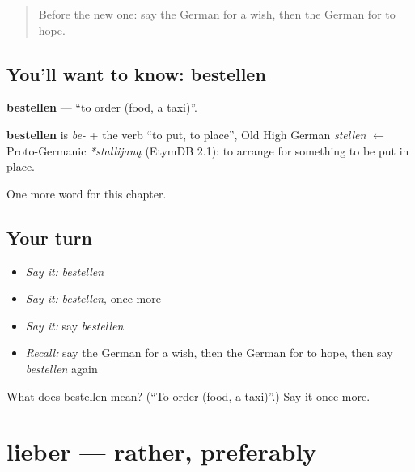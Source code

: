 \label{lesson:GE-C136-bestellen}



\begin{quote}
Before the new one: say the German for a wish, then the German for to hope.
\end{quote}

\subsection*{You'll want to know: bestellen}
\textbf{bestellen} — \textquotedblleft{}to order (food, a taxi)\textquotedblright{}.

\begin{cousinweb}
\textbf{bestellen} is \emph{be-} + the verb \textquotedblleft{}to put, to place\textquotedblright{}, Old High German \emph{stellen} $\leftarrow$ Proto-Germanic \emph{*stallijaną} (EtymDB 2.1): to arrange for something to be put in place.
\end{cousinweb}

\begin{grammarlens}[title={What you've built}]
One more word for this chapter.
\end{grammarlens}

\subsection*{Your turn}
\begin{itemize}
\raggedright
  \item \emph{Say it:} \emph{bestellen}
  \item \emph{Say it:} \emph{bestellen}, once more
  \item \emph{Say it:} say \emph{bestellen}
  \item \emph{Recall:} say the German for a wish, then the German for to hope, then say \emph{bestellen} again
\end{itemize}

\begin{tcolorbox}[breakable,colback=teal!4,colframe=teal!35!black,title={Before you move on}]
What does bestellen mean? (\textquotedblleft{}To order (food, a taxi)\textquotedblright{}.) Say it once more.
\end{tcolorbox}
\section[lieber]{lieber — rather, preferably}

\label{lesson:GE-C136-lieber}



